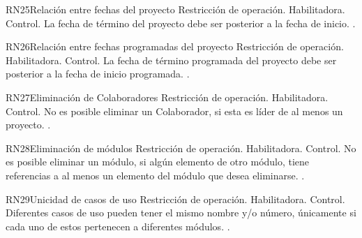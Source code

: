 \begin{BussinesRule}{RN25}{Relación entre fechas del proyecto} 
	\BRitem[Tipo:] Restricción de operación. 
	\BRitem[Clase:] Habilitadora. 
	\BRitem[Nivel:] Control. %
	\BRitem[Descripción:] La fecha de término del proyecto debe ser posterior a la fecha de inicio.
	 \UCref{}{}. 
\end{BussinesRule}

\begin{BussinesRule}{RN26}{Relación entre fechas programadas del proyecto} 
	\BRitem[Tipo:] Restricción de operación. 
	\BRitem[Clase:] Habilitadora. 
	\BRitem[Nivel:] Control. %
	\BRitem[Descripción:] La fecha de término programada del proyecto debe ser posterior a la fecha de inicio programada.
	 \UCref{}{}. 
\end{BussinesRule}

\begin{BussinesRule}{RN27}{Eliminación de Colaboradores} 
	\BRitem[Tipo:] Restricción de operación. 
	\BRitem[Clase:] Habilitadora. 
	\BRitem[Nivel:] Control. %
	\BRitem[Descripción:] No es posible eliminar un Colaborador, si esta es líder de al menos un proyecto.
	 . 
\end{BussinesRule}

\begin{BussinesRule}{RN28}{Eliminación de módulos} 
	\BRitem[Tipo:] Restricción de operación. 
	\BRitem[Clase:] Habilitadora. 
	\BRitem[Nivel:] Control. %
	\BRitem[Descripción:] No es posible eliminar un módulo, si algún elemento de otro módulo, tiene referencias a al menos un elemento del módulo que desea eliminarse.
	 . 
\end{BussinesRule}

\begin{BussinesRule}{RN29}{Unicidad de casos de uso} 
	\BRitem[Tipo:] Restricción de operación. 
	\BRitem[Clase:] Habilitadora. 
	\BRitem[Nivel:] Control. %
	\BRitem[Descripción:] Diferentes casos de uso pueden tener el mismo nombre y/o número, únicamente si cada uno de estos pertenecen a diferentes módulos.
	 . 
\end{BussinesRule}

